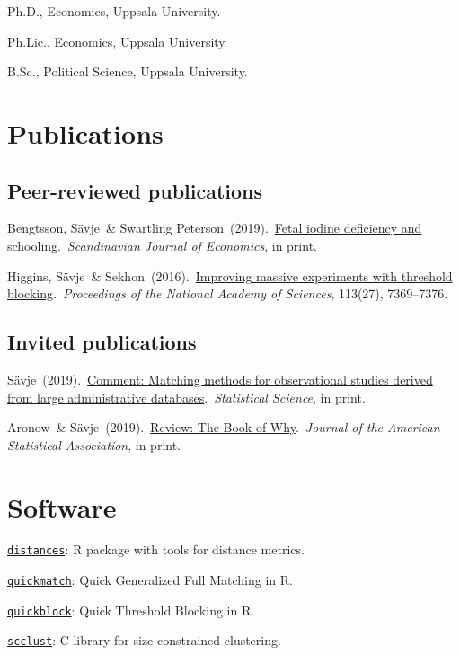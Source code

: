 \documentclass[10pt,letterpaper]{article}
\newenvironment{singledatelist}{
	\begin{list}{}{
		\setlength{\parskip}{0pt}
		\setlength{\itemsep}{4pt}
		\setlength{\parsep}{0.3em}
		\setlength{\leftmargin}{3.5em}
		\setlength{\labelwidth}{3.5em}
		\setlength{\labelsep}{1.5em}
		}
	}{
\end{list}
}
\newcommand{\dateitem}[2][]{\item[{#1}] {#2}}
\newenvironment{infolist}{
	\begin{list}{}{
		\setlength{\parskip}{0pt}
		\setlength{\itemsep}{4pt}
		\setlength{\parsep}{0.3em}
		\setlength{\leftmargin}{0em}
		\setlength{\labelwidth}{0em}
		}
	}{
\end{list}
}
\newcommand{\infoitem}[1]{\item {#1}}
\begin{document}
	\begin{singledatelist}
		\dateitem[2015]{Ph.D., Economics, Uppsala University.}
		\dateitem[2013]{Ph.Lic., Economics, Uppsala University.}
		\dateitem[2010]{B.Sc., Political Science, Uppsala University.}
	\end{singledatelist}


	\section*{Publications}

	\subsection*{Peer-reviewed publications}

	\begin{infolist}
		\infoitem{Bengtsson, Sävje\ \& Swartling Peterson\ (2019).\ \href{https://onlinelibrary.wiley.com/doi/abs/10.1111/sjoe.12341}{Fetal iodine deficiency and schooling}.\ \textit{Scandinavian Journal of Economics}, in print.}
		\infoitem{Higgins, Sävje\ \& Sekhon\ (2016).\ \href{https://www.pnas.org/content/113/27/7369}{Improving massive experiments with threshold blocking}.\ \textit{Proceedings of the National Academy of Sciences}, 113(27), 7369--7376.}
	\end{infolist}


	\subsection*{Invited publications}

	\begin{infolist}
		\infoitem{Sävje\ (2019).\ \href{https://www.e-publications.org/ims/submission/STS/user/submissionFile/41236?confirm=452fc878}{Comment: Matching methods for observational studies derived from large administrative databases}.\ \textit{Statistical Science}, in print.}
		\infoitem{Aronow\ \& Sävje\ (2019).\ \href{https://fredriksavje.com/papers/TBOW-review.pdf}{Review: The Book of Why}.\ \textit{Journal of the American Statistical Association}, in print.}
	\end{infolist}


	\section*{Software}

	\begin{infolist}
		\infoitem{\href{https://github.com/fsavje/distances}{\texttt{distances}}: R package with tools for distance metrics.}
		\infoitem{\href{https://github.com/fsavje/quickmatch}{\texttt{quickmatch}}: Quick Generalized Full Matching in R.}
		\infoitem{\href{https://github.com/fsavje/quickblock}{\texttt{quickblock}}: Quick Threshold Blocking in R.}
		\infoitem{\href{https://github.com/fsavje/scclust}{\texttt{scclust}}: C library for size-constrained clustering.}
	\end{infolist}
\end{document}
